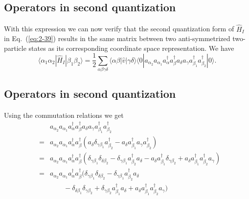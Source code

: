 \documentclass[%
twoside,                 %
final,                   %
10pt]{article}
\begin{document}
\subsection{Operators in second quantization}

\paragraph{}
With this expression we can now verify that the second quantization form of $\hat{H}_I$ in Eq.~(\ref{eq:2-39}) 
results in the same matrix between two anti-symmetrized two-particle states as its corresponding coordinate
space representation. We have  
\begin{equation}
	\langle \alpha_1 \alpha_2|\hat{H}_I|\beta_1 \beta_2\rangle =
		\frac{1}{2} \sum_{\alpha\beta\gamma\delta}
			\langle \alpha\beta|\hat{v}|\gamma\delta\rangle \langle 0|a_{\alpha_2} a_{\alpha_1} 
			 a^{\dagger}_\alpha a^{\dagger}_\beta a_\delta a_\gamma 
			 a_{\beta_1}^{\dagger} a_{\beta_2}^{\dagger}|0\rangle. \label{eq:2-40}
\end{equation}




\subsection{Operators in second quantization}

\paragraph{}
Using the commutation relations we get 
\begin{eqnarray}
	&& a_{\alpha_2} a_{\alpha_1}a^{\dagger}_\alpha a^{\dagger}_\beta 
		a_\delta a_\gamma a_{\beta_1}^{\dagger} a_{\beta_2}^{\dagger} \nonumber \\
	&=& a_{\alpha_2} a_{\alpha_1}a^{\dagger}_\alpha a^{\dagger}_\beta 
		( a_\delta \delta_{\gamma \beta_1} a_{\beta_2}^{\dagger} - 
		a_\delta  a_{\beta_1}^{\dagger} a_\gamma a_{\beta_2}^{\dagger} ) \nonumber \\
	&=& a_{\alpha_2} a_{\alpha_1}a^{\dagger}_\alpha a^{\dagger}_\beta 
		(\delta_{\gamma \beta_1} \delta_{\delta \beta_2} - \delta_{\gamma \beta_1} a_{\beta_2}^{\dagger} a_\delta -
		a_\delta a_{\beta_1}^{\dagger}\delta_{\gamma \beta_2} +
		a_\delta a_{\beta_1}^{\dagger} a_{\beta_2}^{\dagger} a_\gamma ) \nonumber \\
	&=& a_{\alpha_2} a_{\alpha_1}a^{\dagger}_\alpha a^{\dagger}_\beta 
		(\delta_{\gamma \beta_1} \delta_{\delta \beta_2} - \delta_{\gamma \beta_1} a_{\beta_2}^{\dagger} a_\delta \nonumber \\
		&& \qquad - \delta_{\delta \beta_1} \delta_{\gamma \beta_2} + \delta_{\gamma \beta_2} a_{\beta_1}^{\dagger} a_\delta
		+ a_\delta a_{\beta_1}^{\dagger} a_{\beta_2}^{\dagger} a_\gamma ) \label{eq:2-41}
\end{eqnarray}
\end{document}
